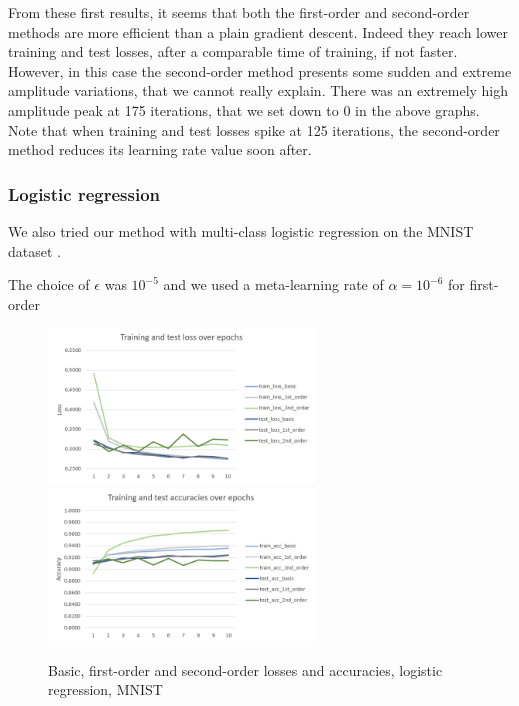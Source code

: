 \documentclass{article}
\begin{document}
  From these first results, it seems that both the first-order and second-order methods are more efficient than a plain gradient descent. Indeed they reach lower training and test losses, after a comparable time of training, if not faster. However, in this case the second-order method presents some sudden and extreme amplitude variations, that we cannot really explain. There was an extremely high amplitude peak at 175 iterations, that we set down to 0 in the above graphs. Note that when training and test losses spike at 125 iterations, the second-order method reduces its learning rate value soon after.
  
  
  \subsubsection{Logistic regression}
  
  We also tried our method with multi-class logistic regression on the MNIST dataset \cite{lecun-mnisthandwrittendigit-2010}.
  
  The choice of $\epsilon$ was $10^{-5}$ and we used a meta-learning rate of $\alpha=10^{-6}$ for first-order
  \begin{figure}[!h]
	\includegraphics[width=200pt]{loss_logistic.png}
	\includegraphics[width=200pt]{acc_logistic.png}
	\caption{Basic, first-order and second-order losses and accuracies, logistic regression, MNIST}
  \end{figure}  
\end{document}
